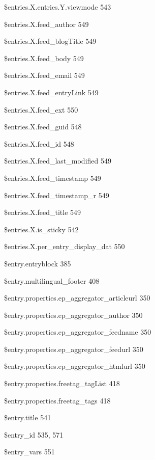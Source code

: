 \documentclass{book}
\renewcommand\subitem{\par}
\begin{document}
\begin{multicols}{2}
\begin{osp-index}
    \subitem \$entries.X.entries.Y.viewmode\hspace{1mm} 543
    \subitem \$entries.X.feed\_author\hspace{1mm} 549
    \subitem \$entries.X.feed\_blogTitle\hspace{1mm} 549
    \subitem \$entries.X.feed\_body\hspace{1mm} 549
    \subitem \$entries.X.feed\_email\hspace{1mm} 549
    \subitem \$entries.X.feed\_entryLink\hspace{1mm} 549
    \subitem \$entries.X.feed\_ext\hspace{1mm} 550
    \subitem \$entries.X.feed\_guid\hspace{1mm} 548
    \subitem \$entries.X.feed\_id\hspace{1mm} 548
    \subitem \$entries.X.feed\_last\_modified\hspace{1mm} 549
    \subitem \$entries.X.feed\_timestamp\hspace{1mm} 549
    \subitem \$entries.X.feed\_timestamp\_r\hspace{1mm} 549
    \subitem \$entries.X.feed\_title\hspace{1mm} 549
    \subitem \$entries.X.is\_sticky\hspace{1mm} 542
    \subitem \$entries.X.per\_entry\_display\_dat\hspace{1mm} 550
    \subitem \$entry.entryblock\hspace{1mm} 385
    \subitem \$entry.multilingual\_footer\hspace{1mm} 408
    \subitem \$entry.properties.ep\_aggregator\_articleurl\hspace{1mm} 
		350
    \subitem \$entry.properties.ep\_aggregator\_author\hspace{1mm} 350
    \subitem \$entry.properties.ep\_aggregator\_feedname\hspace{1mm} 
		350
    \subitem \$entry.properties.ep\_aggregator\_feedurl\hspace{1mm} 350
    \subitem \$entry.properties.ep\_aggregator\_htmlurl\hspace{1mm} 350
    \subitem \$entry.properties.freetag\_tagList\hspace{1mm} 418
    \subitem \$entry.properties.freetag\_tags\hspace{1mm} 418
    \subitem \$entry.title\hspace{1mm} 541
    \subitem \$entry\_id\hspace{1mm} 535, 571
    \subitem \$entry\_vars\hspace{1mm} 551

\end{osp-index}
\end{multicols}
\end{document}
